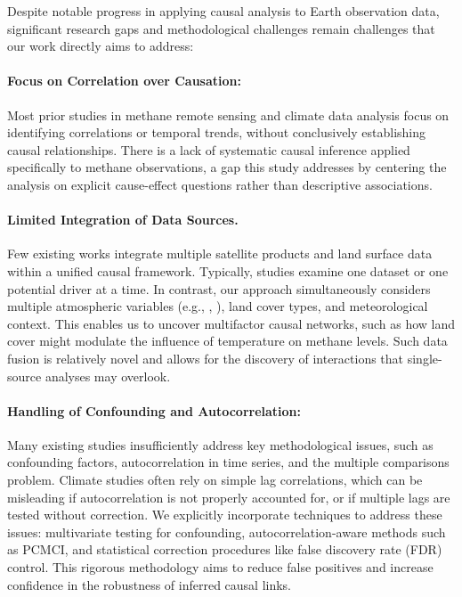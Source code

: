 Despite notable progress in applying causal analysis to Earth observation data, significant research gaps and methodological challenges remain challenges that our work directly aims to address:

\paragraph{Focus on Correlation over Causation:} 
Most prior studies in methane remote sensing and climate data analysis focus on identifying correlations or temporal trends, without conclusively establishing causal relationships. There is a lack of systematic causal inference applied specifically to methane observations, a gap this study addresses by centering the analysis on explicit cause-effect questions rather than descriptive associations.

\paragraph{Limited Integration of Data Sources.} 
Few existing works integrate multiple satellite products and land surface data within a unified causal framework. Typically, studies examine one dataset or one potential driver at a time. In contrast, our approach simultaneously considers multiple atmospheric variables (e.g., , ), land cover types, and meteorological context. This enables us to uncover multifactor causal networks, such as how land cover might modulate the influence of temperature on methane levels. Such data fusion is relatively novel and allows for the discovery of interactions that single-source analyses may overlook.

\paragraph{Handling of Confounding and Autocorrelation:} 
Many existing studies insufficiently address key methodological issues, such as confounding factors, autocorrelation in time series, and the multiple comparisons problem. Climate studies often rely on simple lag correlations, which can be misleading if autocorrelation is not properly accounted for, or if multiple lags are tested without correction. We explicitly incorporate techniques to address these issues: multivariate testing for confounding, autocorrelation-aware methods such as PCMCI, and statistical correction procedures like false discovery rate (FDR) control. This rigorous methodology aims to reduce false positives and increase confidence in the robustness of inferred causal links.

